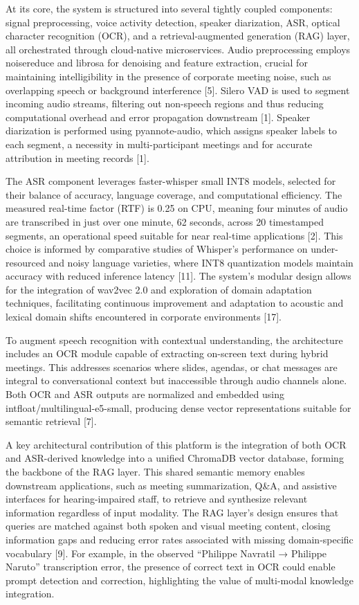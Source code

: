 \documentclass[12pt,a4paper]{article}
\begin{document}
At its core, the system is structured into several tightly coupled components: signal preprocessing, voice activity detection, speaker diarization, ASR, optical character recognition (OCR), and a retrieval-augmented generation (RAG) layer, all orchestrated through cloud-native microservices. Audio preprocessing employs noisereduce and librosa for denoising and feature extraction, crucial for maintaining intelligibility in the presence of corporate meeting noise, such as overlapping speech or background interference [5]. Silero VAD is used to segment incoming audio streams, filtering out non-speech regions and thus reducing computational overhead and error propagation downstream [1]. Speaker diarization is performed using pyannote-audio, which assigns speaker labels to each segment, a necessity in multi-participant meetings and for accurate attribution in meeting records [1].


The ASR component leverages faster-whisper small INT8 models, selected for their balance of accuracy, language coverage, and computational efficiency. The measured real-time factor (RTF) is 0.25 on CPU, meaning four minutes of audio are transcribed in just over one minute, 62 seconds, across 20 timestamped segments, an operational speed suitable for near real-time applications [2]. This choice is informed by comparative studies of Whisper’s performance on under-resourced and noisy language varieties, where INT8 quantization models maintain accuracy with reduced inference latency [11]. The system’s modular design allows for the integration of wav2vec 2.0 and exploration of domain adaptation techniques, facilitating continuous improvement and adaptation to acoustic and lexical domain shifts encountered in corporate environments [17].


To augment speech recognition with contextual understanding, the architecture includes an OCR module capable of extracting on-screen text during hybrid meetings. This addresses scenarios where slides, agendas, or chat messages are integral to conversational context but inaccessible through audio channels alone. Both OCR and ASR outputs are normalized and embedded using intfloat/multilingual-e5-small, producing dense vector representations suitable for semantic retrieval [7].


A key architectural contribution of this platform is the integration of both OCR and ASR-derived knowledge into a unified ChromaDB vector database, forming the backbone of the RAG layer. This shared semantic memory enables downstream applications, such as meeting summarization, Q\&A, and assistive interfaces for hearing-impaired staff, to retrieve and synthesize relevant information regardless of input modality. The RAG layer’s design ensures that queries are matched against both spoken and visual meeting content, closing information gaps and reducing error rates associated with missing domain-specific vocabulary [9]. For example, in the observed “Philippe Navratil → Philippe Naruto” transcription error, the presence of correct text in OCR could enable prompt detection and correction, highlighting the value of multi-modal knowledge integration.
\end{document}

